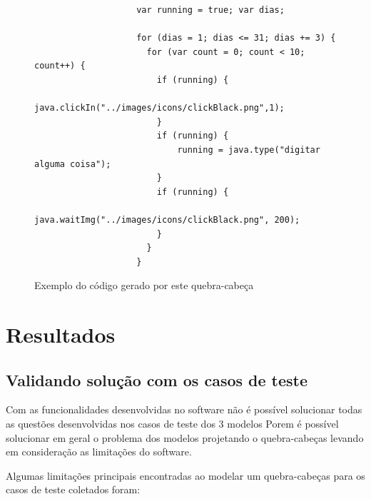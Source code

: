\documentclass[tg]{mdtufsm}
\begin{document}
                \begin{figure}[!htb]
                \begin{lstlisting}
                    var running = true; var dias;

                    for (dias = 1; dias <= 31; dias += 3) {
                      for (var count = 0; count < 10; count++) {
                        if (running) {
                        java.clickIn("../images/icons/clickBlack.png",1);
                        }
                        if (running) {
                            running = java.type("digitar alguma coisa");
                        }
                        if (running) {
                            java.waitImg("../images/icons/clickBlack.png", 200);
                        }
                      }
                    }
                \end{lstlisting}
                    \caption{Exemplo do código gerado por este quebra-cabeça}
                    \label{code:blocosecodigo.js}
                \end{figure}

        \chapter {Resultados}

            \section {Validando solução com os casos de teste}

            Com as funcionalidades desenvolvidas no software não é possível solucionar todas as questões desenvolvidas nos casos de teste dos 3 modelos Porem é possível solucionar em geral o problema dos modelos projetando o quebra-cabeças levando em consideração as limitações do software.

            Algumas limitações principais encontradas ao modelar um quebra-cabeças para os casos de teste coletados foram:
\end{document}
